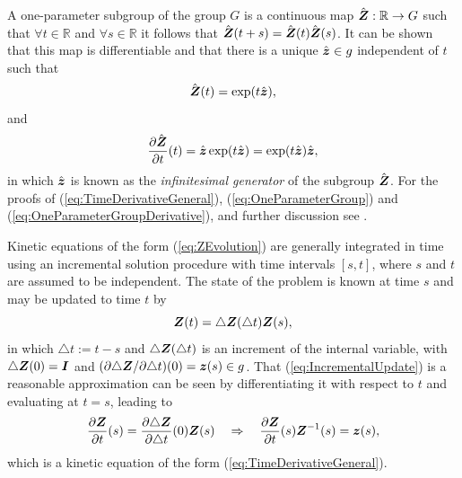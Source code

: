 \documentclass[12pt]{article}
\newcommand{\mbb}[1]{\mathbb{#1}}
\begin{document}
A one-parameter subgroup of the group $G$ is a continuous map
$\hat{\bZ} : \mbb{R} \to G$ such that $\forall t \in \mbb{R}$ and
$\forall s \in \mbb{R}$ it follows that $\hat{{\boldsymbol{Z}}}(t+s) =
\hat{{\boldsymbol{Z}}}(t)\hat{{\boldsymbol{Z}}}(s)$. It can be shown that this map is
differentiable and that there is a unique $\hat{{\boldsymbol{z}}} \in g$
independent of $t$ such that
\begin{equation} \label{eq:OneParameterGroup}
  \hat{{\boldsymbol{Z}}}(t) = \exp(t \hat{{\boldsymbol{z}}}),
\end{equation}
and
\begin{equation} \label{eq:OneParameterGroupDerivative}
  \frac{\partial \hat{{\boldsymbol{Z}}}}{\partial t}(t) =
  \hat{{\boldsymbol{z}}} \exp(t \hat{{\boldsymbol{z}}}) = \exp(t \hat{{\boldsymbol{z}}}) \hat{{\boldsymbol{z}}},
\end{equation}
in which $\hat{{\boldsymbol{z}}}$ is known as the \emph{infinitesimal generator} of
the subgroup $\hat{{\boldsymbol{Z}}}$. For the proofs of
(\ref{eq:TimeDerivativeGeneral}), (\ref{eq:OneParameterGroup}) and
(\ref{eq:OneParameterGroupDerivative}), and further discussion see
\citet*{Procesi:2006, Sepanski:2007, Kosmann-Schwarzbach:2009,
  Gallier:2011}.

Kinetic equations of the form (\ref{eq:ZEvolution}) are generally
integrated in time using an incremental solution procedure with time
intervals $[s, t]$, where $s$ and $t$ are assumed to be
independent. The state of the problem is known at time $s$ and may be
updated to time $t$ by
\begin{equation} \label{eq:IncrementalUpdate}
  {\boldsymbol{Z}}(t) = \triangle {\boldsymbol{Z}}(\triangle t) {\boldsymbol{Z}}(s),
\end{equation}
in which $\triangle t := t-s$ and $\triangle {\boldsymbol{Z}}(\triangle t)$ is an
increment of the internal variable, with $\triangle {\boldsymbol{Z}}(0) = {\boldsymbol{I}}$ and
$(\partial \triangle {\boldsymbol{Z}} / \partial \triangle t)(0) = {\boldsymbol{z}}(s) \in
g$. That (\ref{eq:IncrementalUpdate}) is a reasonable
approximation can be seen by differentiating it
with respect to $t$ and evaluating at $t = s$, leading to
\begin{equation}\label{eq:EvolutionFromUpdate}
  \frac{\partial {\boldsymbol{Z}}}{\partial t}(s) =
  \frac{\partial \triangle {\boldsymbol{Z}}}{\partial \triangle t}(0) {\boldsymbol{Z}}(s)
  \quad
  \Rightarrow
  \quad
  \frac{\partial {\boldsymbol{Z}}}{\partial t}(s) {\boldsymbol{Z}}^{-1}(s) = {\boldsymbol{z}}(s),
\end{equation}
which is a kinetic equation of the form (\ref{eq:TimeDerivativeGeneral}).
\end{document}
